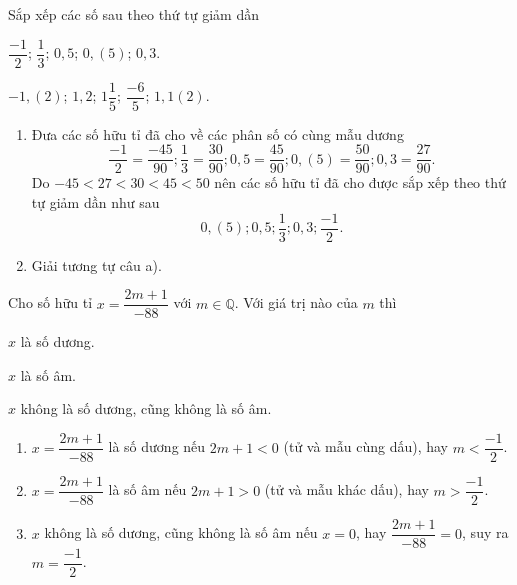 \begin{vd}
Sắp xếp các số sau theo thứ tự giảm dần
\begin{listEX}[2]
	\item $\dfrac{-1}{2}$; $\dfrac{1}{3}$; $0,5$; $0,(5)$; $0,3$.
	\item $-1,(2)$; $1,2$; $1\dfrac{1}{5}$; $\dfrac{-6}{5}$; $1,1(2)$.
\end{listEX}
\loigiai
{
\begin{enumerate}
\item Đưa các số hữu tỉ đã cho về các phân số có cùng mẫu dương
$$\dfrac{-1}{2}=\dfrac{-45}{90}; \dfrac{1}{3}=\dfrac{30}{90}; 0,5=\dfrac{45}{90}; 0,(5)=\dfrac{50}{90}; 0,3=\dfrac{27}{90}.$$
Do $-45<27<30<45<50$ nên các số hữu tỉ đã cho được sắp xếp theo thứ tự giảm dần như sau $$0,(5); 0,5; \dfrac{1}{3}; 0,3; \dfrac{-1}{2}.$$
\item Giải tương tự câu a).
\end{enumerate}
}
\end{vd}
\begin{vd} Cho số hữu tỉ $x=\dfrac{2m+1}{-88}$ với $m\in\mathbb{Q}$. Với giá trị nào của $m$ thì
\begin{listEX}
	\item $x$ là số dương.
	\item $x$ là số âm.
	\item $x$ không là số dương, cũng không là số âm.
\end{listEX}
\loigiai
{
\begin{enumerate}
\item $x=\dfrac{2m+1}{-88}$ là số dương nếu $2m+1<0$ (tử và mẫu cùng dấu), hay $m<\dfrac{-1}{2}$.
\item $x=\dfrac{2m+1}{-88}$ là số âm nếu $2m+1>0$ (tử và mẫu khác dấu), hay $m>\dfrac{-1}{2}$.
\item $x$ không là số dương, cũng không là số âm nếu $x=0$, hay $\dfrac{2m+1}{-88}=0$, suy ra $m=\dfrac{-1}{2}$.
\end{enumerate}
}
\end{vd}

